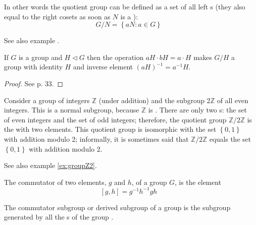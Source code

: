 \begin{appendices}
\begin{definition}
  In other words the quotient group can be defined as a set of all
  left s (they also equal to the right cosets as
  soon as $N$ is a ):
  \[
  G/N = \left\{a N: a \in G\right\}
  \]

  See also example .
  \label{def:quotientgroup}
\end{definition}

\begin{theorem}
  If $G$ is a group and $H \triangleleft G$ then the operation $aH
  \cdot bH = a \cdot H$ makes $G/H$ a group with identity $H$ and
  inverse element $\left(a H\right)^{-1} = a^{-1} H$.
  \begin{proof}
    See \cite{book:kostrikin} p. 33.
  \end{proof}
  \label{thm:quotientgroup}
\end{theorem}

\begin{example}
  Consider \cite{wiki:quotientgroup} a group of integers $\mathbb{Z}$
  (under addition) and the 
  subgroup $2\mathbb{Z}$ of all even integers. This is a normal
  subgroup, because $\mathbb{Z}$ is . There
  are only two s: the set 
  of even integers and the set of odd integers; therefore, the
  quotient group $\mathbb{Z}/2\mathbb{Z}$ is the
   with two 
  elements. This 
  quotient group is isomorphic with the set $\left\{ 0, 1 \right\}$
  with addition modulo 2; informally, it is sometimes said that
  $\mathbb{Z}/2\mathbb{Z}$
  equals the set $\left\{ 0, 1 \right\}$ with addition modulo 2.

  See also example \ref{ex:groupZ2}.
  \label{ex:quotientgroup}
\end{example}

\begin{definition}[Commutator]
  The commutator of two elements, $g$ and $h$, of a group $G$, is the
  element \cite{wiki:commutator}
  \[
  \left[g, h\right] = g^{-1} h^{-1} g h
  \]
  \label{def:commutator}
\end{definition}

\begin{definition}
  The commutator subgroup or derived subgroup of a group is the
  subgroup generated by all the s of the group 
  \cite{wiki:commutatorsubgroup}.
  \label{def:commutatorsubgroup}
\end{definition}


\end{appendices}

